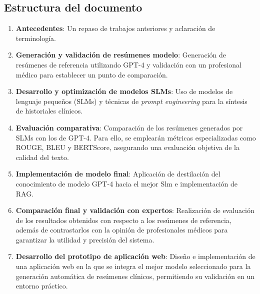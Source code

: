 \documentclass[../main.tex]{subfiles}
\begin{document}
\subsection{Estructura del documento}

\begin{enumerate}
    \item \textbf{Antecedentes}: Un repaso de trabajos anteriores y aclaración de terminología.
    \item \textbf{Generación y validación de resúmenes modelo}: Generación de resúmenes de referencia utilizando GPT-4 y validación con un profesional médico para establecer un punto de comparación.
    \item \textbf{Desarrollo y optimización de modelos SLMs}: Uso de modelos de lenguaje pequeños (SLMs) y técnicas de \textit{prompt engineering} para la síntesis de historiales clínicos. 
    \item \textbf{Evaluación comparativa}: Comparación de los resúmenes generados por SLMs con los de GPT-4. Para ello, se emplearán métricas especializadas como ROUGE, BLEU y BERTScore, asegurando una evaluación objetiva de la calidad del texto.
    \item \textbf{Implementación de modelo final}: Aplicación de destilación del conocimiento de modelo GPT-4 hacia el mejor Slm e implementación de RAG.

    \item \textbf{Comparación final y validación con expertos}: Realización de  evaluación de los resultados obtenidos con respecto a los resúmenes de referencia, además de contrastarlos con la opinión de profesionales médicos para garantizar la utilidad y precisión del sistema.
    \item \textbf{Desarrollo del prototipo de aplicación web}: Diseño e implementación de una aplicación web en la que se integra el mejor modelo seleccionado para la generación automática de resúmenes clínicos, permitiendo su validación en un entorno práctico.

\end{enumerate}
\end{document}
